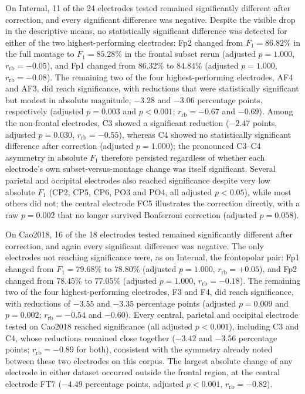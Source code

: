 On Internal, 11 of the 24 electrodes tested remained significantly different after correction, and every significant difference was negative. Despite the visible drop in the descriptive means, no statistically significant difference was detected for either of the two highest-performing electrodes: Fp2 changed from $F_1=86.82\%$ in the full montage to $F_1=85.28\%$ in the frontal subset rerun (adjusted $p=1.000$, $r_{\mathrm{rb}}=-0.05$), and Fp1 changed from $86.32\%$ to $84.84\%$ (adjusted $p=1.000$, $r_{\mathrm{rb}}=-0.08$). The remaining two of the four highest-performing electrodes, AF4 and AF3, did reach significance, with reductions that were statistically significant but modest in absolute magnitude, $-3.28$ and $-3.06$ percentage points, respectively (adjusted $p=0.003$ and $p<0.001$; $r_{\mathrm{rb}}=-0.67$ and $-0.69$). Among the non-frontal electrodes, C3 showed a significant reduction ($-2.47$ points, adjusted $p=0.030$, $r_{\mathrm{rb}}=-0.55$), whereas C4 showed no statistically significant difference after correction (adjusted $p=1.000$); the pronounced C3--C4 asymmetry in absolute $F_1$ therefore persisted regardless of whether each electrode's own subset-versus-montage change was itself significant. Several parietal and occipital electrodes also reached significance despite very low absolute $F_1$ (CP2, CP5, CP6, PO3 and PO4, all adjusted $p<0.05$), while most others did not; the central electrode FC5 illustrates the correction directly, with a raw $p=0.002$ that no longer survived Bonferroni correction (adjusted $p=0.058$).

On Cao2018, 16 of the 18 electrodes tested remained significantly different after correction, and again every significant difference was negative. The only electrodes not reaching significance were, as on Internal, the frontopolar pair: Fp1 changed from $F_1=79.68\%$ to $78.80\%$ (adjusted $p=1.000$, $r_{\mathrm{rb}}=+0.05$), and Fp2 changed from $78.45\%$ to $77.05\%$ (adjusted $p=1.000$, $r_{\mathrm{rb}}=-0.18$). The remaining two of the four highest-performing electrodes, F3 and F4, did reach significance, with reductions of $-3.55$ and $-3.35$ percentage points (adjusted $p=0.009$ and $p=0.002$; $r_{\mathrm{rb}}=-0.54$ and $-0.60$). Every central, parietal and occipital electrode tested on Cao2018 reached significance (all adjusted $p<0.001$), including C3 and C4, whose reductions remained close together ($-3.42$ and $-3.56$ percentage points; $r_{\mathrm{rb}}=-0.89$ for both), consistent with the symmetry already noted between these two electrodes on this corpus. The largest absolute change of any electrode in either dataset occurred outside the frontal region, at the central electrode FT7 ($-4.49$ percentage points, adjusted $p<0.001$, $r_{\mathrm{rb}}=-0.82$).

